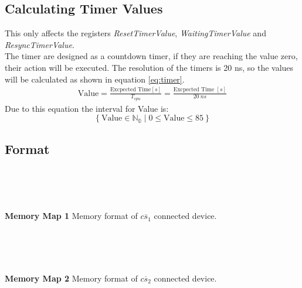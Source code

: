 \subsection{Calculating Timer Values}
\label{sec:CTV}
This only affects the registers \textit{ResetTimerValue}, \textit{WaitingTimerValue} and \textit{ResyncTimerValue}. \\ 
The timer are designed as a countdown timer, if they are reaching the value zero, their action will be executed. The resolution of the timers is 20 ns, so the values will be calculated as shown in equation \ref{eq:timer}.
\begin{equation}
	\begin{split}
			\text{Value} = \frac{\text{Excpected Time} \left[s\right]}{T_{cpu}} = \frac{\text{Excpected Time }\left[s\right] }{20 ~ns} 
	\end{split}
\label{eq:timer}
\end{equation}	
Due to this equation the interval for Value is: $$\left\{\text{Value} \in \mathbb{N_0} \mid 0 \leq \text{Value} \leq 85 \right\}$$
\subsection{Format}
\label{sec:format}
\begin{center}
\begin{bytefield}[rightcurlyspace = 10pt]{32}
		 \\
		 \\
\end{bytefield} \\
\textbf{Memory Map 1} Memory format of $\overline{cs_1}$ connected device. 
\end{center}
\begin{center}
	\begin{bytefield}[rightcurlyspace = 10pt]{32}
		 \\
		 \\
	\end{bytefield} \\
	\textbf{Memory Map 2} Memory format of $\overline{cs_2}$ connected device. 
\end{center}
